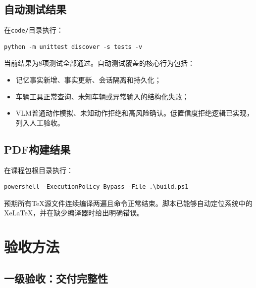 \documentclass[UTF8,zihao=-4]{ctexart}
\begin{document}
\subsection{自动测试结果}

在\texttt{code/}目录执行：

\begin{lstlisting}
python -m unittest discover -s tests -v
\end{lstlisting}

当前结果为8项测试全部通过。自动测试覆盖的核心行为包括：

\begin{itemize}
  \item 记忆事实新增、事实更新、会话隔离和持久化；
  \item 车辆工具正常查询、未知车辆或异常输入的结构化失败；
  \item VLM普通动作模拟、未知动作拒绝和高风险确认。低置信度拒绝逻辑已实现，列入人工验收。
\end{itemize}

\subsection{PDF构建结果}

在课程包根目录执行：

\begin{lstlisting}
powershell -ExecutionPolicy Bypass -File .\build.ps1
\end{lstlisting}

预期所有TeX源文件连续编译两遍且命令正常结束。脚本已能够自动定位系统中的XeLaTeX，并在缺少编译器时给出明确错误。


\section{验收方法}

\subsection{一级验收：交付完整性}
\end{document}
